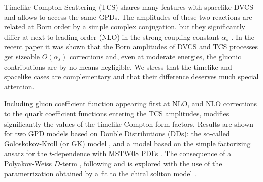 Timelike Compton Scattering (TCS) shares many features with spacelike DVCS
and allows to access the same GPDs. The amplitudes of these two reactions are
related at Born order by a simple complex conjugation, but they significantly
differ at next to leading order (NLO) in the strong coupling constant
$\alpha_s$ \cite{Muller:2012yq}. In the recent paper \cite{Moutarde:2013qs}
it was shown that the Born amplitudes of DVCS and TCS processes get sizeable
$O(\alpha_s)$ corrections and, even at moderate energies, the gluonic
contributions are by no means negligible. We stress that the timelike and
spacelike cases are complementary and that their difference deserves much
special attention.


Including gluon coefficient function appearing first at NLO,
and NLO corrections to the quark coefficient functions
\cite{Ji:1997nk,Mankiewicz:1997bk,Belitsky:1999sg,Freund:2001rk,Pire:2011st}
entering the TCS amplitudes, modifies significantly the values of the timelike
Compton form factors. Results are shown for two GPD models based on Double
Distributions (DDs): the so-called Goloskokov-Kroll (or GK) model
\cite{Goloskokov:2005sd,Goloskokov:2006hr,Goloskokov:2007nt,Kroll:2012sm},
and a model based on the simple factorizing ansatz for the $t$-dependence
\cite{Berger:2001xd} with MSTW08 PDFs \cite{Martin:2009iq}. The consequence
of a Polyakov-Weiss $D$-term \cite{Polyakov:1999gs}, following
\cite{Berger:2001xd} and \cite{Diehl:2003ny} is explored with the use
of the parametrization obtained by a fit to the chiral soliton model
\cite{Kivel:2000fg}.


